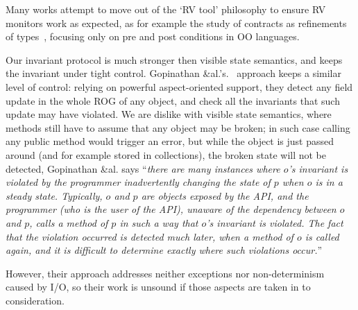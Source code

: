 Many works attempt to move out of the `RV tool' philosophy to ensure RV monitors work as expected, as for example
the study of contracts as refinements of types~\cite{findler2001contract}, focusing only on pre and post conditions in OO languages.

Our invariant protocol is much stronger then
visible state semantics, and keeps the invariant under tight control.
Gopinathan \&al.'s.~\cite{Gopinathan:2008:RMO:1483018.1483028} approach keeps
a similar level of control:
relying on powerful aspect-oriented support, they detect any field update in the whole ROG of any object, and check all the invariants that such update may have violated.
We are dislike with visible state semantics, where  methods still have to assume that any object may be broken; in such case calling any public method would trigger an error, but while the object is just passed around (and for example stored in collections), the broken state will not be detected, Gopinathan \&al. says ``\emph{there are many instances where $o$'s invariant is violated by the programmer inadvertently changing the state of $p$ when $o$ is in a steady state. Typically, $o$ and $p$ are objects exposed by the API, and the programmer (who is the user of the API), unaware of the dependency between $o$ and $p$, calls a method of $p$ in such a way that $o$'s invariant is violated. The fact that the violation occurred is detected much later, when a method of $o$ is called again, and it is difficult to determine exactly where such violations occur.}''

However, their approach addresses neither exceptions nor non-determinism caused by I/O, so their work is unsound if those aspects are taken in to consideration.

